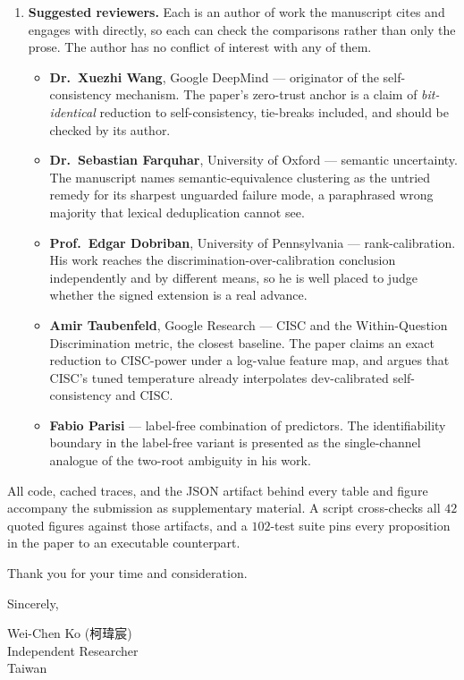 \documentclass[11pt]{article}
\begin{document}
\begin{enumerate}[leftmargin=*]
\item \textbf{Suggested reviewers.} Each is an author of work the manuscript
cites and engages with directly, so each can check the comparisons rather than
only the prose. The author has no conflict of interest with any of them.
\begin{itemize}[leftmargin=1.2em]
  \item \textbf{Dr.\ Xuezhi Wang}, Google DeepMind --- originator of the
        self-consistency mechanism. The paper's zero-trust anchor is a claim
        of \emph{bit-identical} reduction to self-consistency, tie-breaks
        included, and should be checked by its author.
  \item \textbf{Dr.\ Sebastian Farquhar}, University of Oxford --- semantic
        uncertainty. The manuscript names semantic-equivalence clustering as
        the untried remedy for its sharpest unguarded failure mode, a
        paraphrased wrong majority that lexical deduplication cannot see.
  \item \textbf{Prof.\ Edgar Dobriban}, University of Pennsylvania ---
        rank-calibration. His work reaches the discrimination-over-calibration
        conclusion independently and by different means, so he is well placed
        to judge whether the signed extension is a real advance.
  \item \textbf{Amir Taubenfeld}, Google Research --- CISC and the
        Within-Question Discrimination metric, the closest baseline. The
        paper claims an exact reduction to CISC-power under a log-value
        feature map, and argues that CISC's tuned temperature already
        interpolates dev-calibrated self-consistency and CISC.
  \item \textbf{Fabio Parisi} --- label-free combination of predictors. The
        identifiability boundary in the label-free variant is presented as the
        single-channel analogue of the two-root ambiguity in his work.
\end{itemize}

\end{enumerate}

\noindent
All code, cached traces, and the JSON artifact behind every table and figure
accompany the submission as supplementary material. A script cross-checks all
$42$ quoted figures against those artifacts, and a $102$-test suite pins every
proposition in the paper to an executable counterpart.

Thank you for your time and consideration.

\vspace{2em}

\noindent
Sincerely,

\vspace{1.5em}

\noindent
Wei-Chen Ko ({\zhfont 柯瑋宸}) \\
Independent Researcher \\
Taiwan
\end{document}
